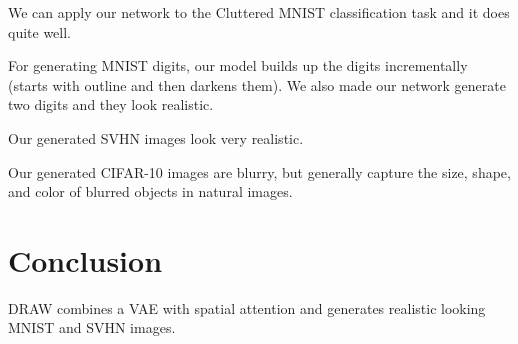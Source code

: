 \documentclass[a4paper]{article}
\begin{document}
We can apply our network to the Cluttered MNIST classification task and it
does quite well.

For generating MNIST digits, our model builds up the digits incrementally
(starts with outline and then darkens them). We also made our network generate
two digits and they look realistic.

Our generated SVHN images look very realistic.


Our generated CIFAR-10 images are blurry, but generally capture the size,
shape, and color of blurred objects in natural images.

\section{Conclusion}
DRAW combines a VAE with spatial attention and generates realistic looking
MNIST and SVHN images.
\end{document}
